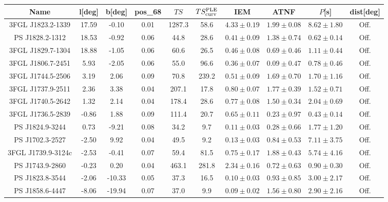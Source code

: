 



\begin{table*}
\center
\begin{tabular}{|c|c|c|c|c|c|c|c|c|c|}
\hline
Name & l[deg]& b[deg] & pos\_68 & $TS$  & $TS^{\rm{PLE}}_{\rm{curv}}$  & IEM & ATNF & $P$[s] & dist[deg]\\
\hline
\hline
 3FGL J1823.2-1339 & 17.59 & -0.10 & 0.01 & 1287.3 & 58.6 & $4.33\pm0.19$ & $1.99\pm0.08$ & $8.62\pm1.80$ & Off. \\
\hline 
 PS J1828.2-1312 & 18.53 & -0.92 & 0.06 & 44.8 & 28.6 & $0.41\pm0.09$ & $1.38\pm0.74$ & $0.62\pm0.14$ & Off. \\
\hline 
 3FGL J1829.7-1304 & 18.88 & -1.05 & 0.06 & 60.6 & 26.5 & $0.46\pm0.08$ & $0.69\pm0.46$ & $1.11\pm0.44$ & Off. \\
\hline 
 3FGL J1806.7-2451 & 5.93 & -2.05 & 0.06 & 55.0 & 96.6 & $0.36\pm0.07$ & $0.09\pm0.47$ & $0.78\pm0.46$ & Off. \\
\hline 
 3FGL J1744.5-2506 & 3.19 & 2.06 & 0.09 & 70.8 & 239.2 & $0.51\pm0.09$ & $1.69\pm0.70$ & $1.70\pm1.16$ & Off. \\
\hline 
 3FGL J1737.9-2511 & 2.36 & 3.38 & 0.04 & 207.1 & 17.8 & $0.80\pm0.07$ & $1.77\pm0.39$ & $1.52\pm0.71$ & Off. \\
\hline 
 3FGL J1740.5-2642 & 1.32 & 2.14 & 0.04 & 178.4 & 28.6 & $0.77\pm0.08$ & $1.50\pm0.34$ & $2.04\pm0.69$ & Off. \\
\hline 
 3FGL J1736.5-2839 & -0.86 & 1.88 & 0.09 & 111.4 & 20.7 & $0.65\pm0.11$ & $0.23\pm0.97$ & $0.43\pm0.14$ & Off. \\
\hline 
 PS J1824.9-3244 & 0.73 & -9.21 & 0.08 & 34.2 & 9.7 & $0.11\pm0.03$ & $0.28\pm0.66$ & $1.77\pm1.20$ & Off. \\
\hline 
 PS J1702.3-2527 & -2.50 & 9.92 & 0.04 & 49.5 & 9.2 & $0.13\pm0.03$ & $0.84\pm0.53$ & $7.11\pm3.75$ & Off. \\
\hline 
 3FGL J1739.9-3124c & -2.53 & -0.41 & 0.07 & 59.4 & 81.5 & $0.75\pm0.17$ & $1.88\pm0.43$ & $5.74\pm4.16$ & Off. \\
\hline 
 PS J1743.9-2860 & -0.23 & 0.20 & 0.04 & 463.1 & 281.8 & $2.34\pm0.16$ & $0.72\pm0.63$ & $0.90\pm0.30$ & Off. \\
\hline 
 PS J1823.8-3544 & -2.06 & -10.33 & 0.05 & 37.3 & 16.5 & $0.10\pm0.03$ & $0.93\pm0.85$ & $3.00\pm2.17$ & Off. \\
\hline 
 PS J1858.6-4447 & -8.06 & -19.94 & 0.07 & 37.0 & 9.9 & $0.09\pm0.02$ & $1.56\pm0.80$ & $2.90\pm2.16$ & Off. \\
\hline 

\end{tabular}
\end{table*}
